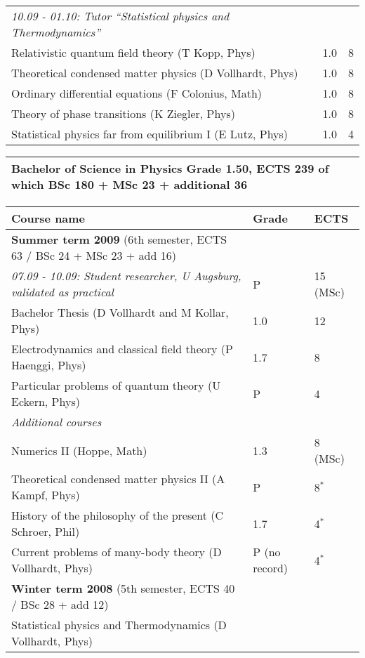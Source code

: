 {\begin{longtable}[t]{p{\widthA} p{\widthB} p{\widthC}}
\textit{10.09 - 01.10: Tutor ``Statistical physics and Thermodynamics''}\\
Relativistic quantum field theory (T Kopp, Phys)
& 1.0
& 8\\
Theoretical condensed matter physics (D Vollhardt, Phys)
& 1.0
& 8\\
Ordinary differential equations (F Colonius, Math)
& 1.0
& 8\\
Theory of phase transitions (K Ziegler, Phys)
& 1.0
& 8\\
Statistical physics far from equilibrium I (E Lutz, Phys)
& 1.0
& 4\\
\hline \hline
\end{longtable}

\newpage

\noindent \begin{longtable}[t]{p{}}
\textbf{\normalsize{Bachelor of Science in Physics}}
Grade 1.50, ECTS 239 of which BSc 180 + MSc 23 + additional 36
\\ \hline \hline
\end{longtable}
\vspace{-2em}\noindent \begin{longtable}[t]{p{\widthA} p{\widthB} p{\widthC}}
Course name
& Grade
& ECTS \\ \hline
\textbf{Summer term 2009} (6th semester, ECTS 63 / BSc 24 + MSc 23 + add 16) \\
\textit{07.09 - 10.09: Student researcher, U Augsburg, validated as practical }
& P
& 15 (MSc)\\
Bachelor Thesis (D Vollhardt and M Kollar, Phys)
& 1.0
& 12\\
Electrodynamics and classical field theory (P Haenggi, Phys)
& 1.7
& 8\\
Particular problems of quantum theory (U Eckern, Phys)
& P
& 4\\
\textit{Additional courses}\\
Numerics II (Hoppe, Math)
& 1.3
& 8 (MSc)\\
Theoretical condensed matter physics II (A Kampf, Phys)
& P
& 8$^*$\\
History of the philosophy of the present (C Schroer, Phil)
& 1.7
& 4$^*$\\ 
Current problems of many-body theory (D Vollhardt, Phys)
& P (no record)
& 4$^*$\\
\hline
\textbf{Winter term 2008} (5th semester, ECTS 40 / BSc 28 + add 12)\\
Statistical physics and Thermodynamics (D Vollhardt, Phys)

\end{longtable}}
